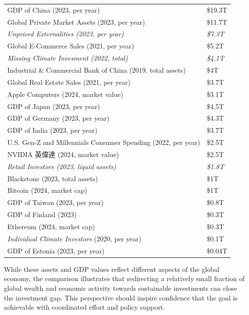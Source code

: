 \documentclass[
  letterpaper,
  DIV=11,
  numbers=noendperiod]{scrartcl}
\begin{document}
\begin{longtable}[]{@{}
  >{\raggedright\arraybackslash}p{}
  >{\raggedright\arraybackslash}p{}@{}}
GDP of China (2023, per year) & \$19.3T \\
Global Private Market Assets (2023, per year) & \$11.7T \\
\emph{Unpriced Externalities (2023, per year)} & \emph{\$7.3T} \\
Global E-Commerce Sales (2021, per year) & \$5.2T \\
\emph{Missing Climate Invesment (2022, total)} & \emph{\$4.1T} \\
Industrial \& Commercial Bank of China (2019, total assets) & \$4T \\
Global Real Estate Sales (2021, per year) & \$3.7T \\
Apple Computers (2024, market value) & \$3.1T \\
GDP of Japan (2023, per year) & \$4.5T \\
GDP of Germany (2023, per year) & \$4.3T \\
GDP of India (2023, per year) & \$3.7T \\
U.S. Gen-Z and Millennials Consumer Spending (2022, per year) &
\$2.5T \\
NVIDIA 英偉達 (2024, market value) & \$2.5T \\
\emph{Retail Investors (2023, liquid assets)} & \emph{\$1.8T} \\
Blackstone (2023, total assets) & \$1T \\
Bitcoin (2024, market cap) & \$1T \\
GDP of Taiwan (2023, per year) & \$0.8T \\
GDP of Finland (2023) & \$0.3T \\
Ethereum (2024, market cap) & \$0.3T \\
\emph{Individual Climate Investors} (2020, per year) & \$0.1T \\
GDP of Estonia (2023, per year) & \$0.04T \\
\end{longtable}

While these assets and GDP values reflect different aspects of the
global economy, the comparison illustrates that redirecting a relatively
small fraction of global wealth and economic activity towards
sustainable investments can close the investment gap. This perspective
should inspire confidence that the goal is achievable with coordinated
effort and policy support.
\end{document}
